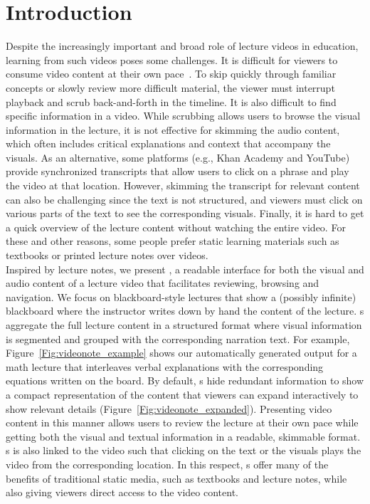 
\section{Introduction}
Despite the increasingly important and broad role of lecture videos in education, learning from such videos poses some challenges. 
%
It is difficult for viewers to consume video content at their own pace~\cite{chi2012mixt}.
%
To skip quickly through familiar concepts or slowly review more difficult material, the viewer must interrupt playback and scrub back-and-forth in the timeline.
%
It is also difficult to find specific information in a video. While scrubbing allows users to browse the visual information in the lecture, it is not effective for skimming the audio content, which often includes critical explanations and context that accompany the visuals. As an alternative, some platforms (e.g., Khan Academy and YouTube) provide synchronized transcripts that allow users to click on a phrase and play the video at that location. However, skimming the transcript for relevant content can also be challenging since the text is not structured, and viewers must click on various parts of the text to see the corresponding visuals. 
%
Finally, it is hard to get a quick overview of the lecture content without watching the entire video. 
For these and other reasons, some people prefer static learning materials such as textbooks or printed lecture notes over videos.\\

Inspired by lecture notes, we present \systemname, a readable interface for both the visual and audio content of a lecture video that facilitates reviewing, browsing and navigation. 
%
We focus on blackboard-style lectures that show a (possibly infinite) blackboard where the instructor writes down by hand the content of the lecture. \systemname s aggregate the full lecture content in a structured format where visual information is segmented and grouped with the corresponding narration text. For example, Figure~\ref{Fig:videonote_example} shows our automatically generated output for a math lecture that interleaves verbal explanations with the corresponding equations written on the board. 
%
By default, \systemname s hide redundant information to show a compact representation of the content that viewers can expand interactively to show relevant details (Figure~\ref{Fig:videonote_expanded}). 
%
Presenting video content in this manner allows users to review the lecture at their own pace while getting both the visual and textual information in a readable, skimmable format.
%
\systemname s is also linked to the video such that clicking on the text or the visuals plays the video from the corresponding location.
%
In this respect, \systemname s offer many of the benefits of traditional static media, such as textbooks and lecture notes, while also giving viewers direct access to the video content.\\

